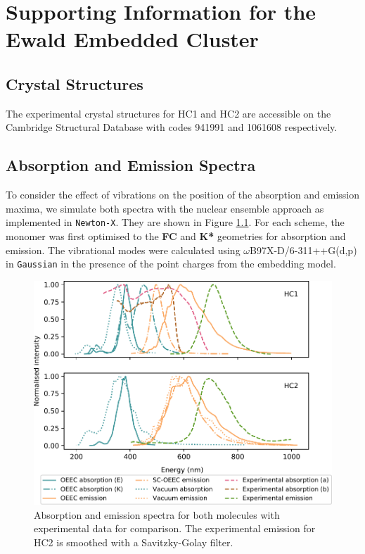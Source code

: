 \chapter{Supporting Information for the Ewald Embedded Cluster}

\label{app:ew}
\section{Crystal Structures}
\label{app:sec:cryst_struct}

The experimental crystal structures for HC1 and HC2 are accessible on the Cambridge Structural Database with codes 941991 and 1061608 respectively.\cite{Zhang2015}

\section{Absorption and Emission Spectra}
\label{app:sec:spectra}

To consider the effect of vibrations on the position of the absorption and emission maxima, we simulate both spectra with the nuclear ensemble approach as implemented in \texttt{Newton-X}.\cite{Crespo-Otero2012,newtonx} They are shown in Figure \ref{fig:spec}. For each scheme, the monomer was first optimised to the \textbf{FC} and \textbf{K*} geometries for absorption and emission. The vibrational modes were calculated using $\omega$B97X-D/6-311++G(d,p) in \texttt{Gaussian}\cite{g16} in the presence of the point charges from the embedding model. 

\begin{figure}[H]
\includegraphics[width=\textwidth]{Appendices/A/spectra.pdf}
\caption{Absorption and emission spectra for both molecules with experimental data\cite{Zhang2015} for comparison. The experimental emission for HC2 is smoothed with a Savitzky-Golay filter.}
\label{fig:spec}
\end{figure}


